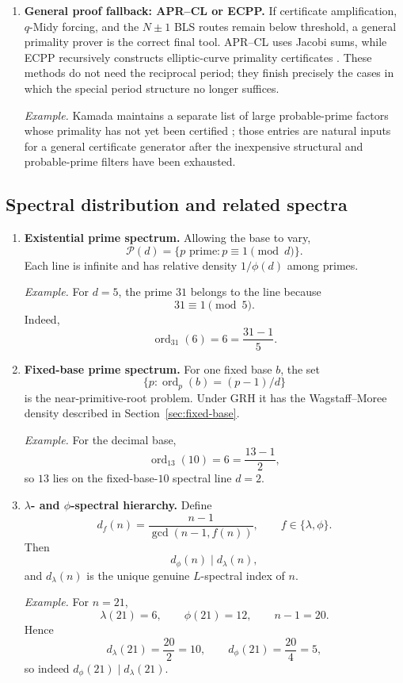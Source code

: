 \documentclass[11pt]{article}
\newcommand{\ord}{\operatorname{ord}}
\begin{document}
\begin{enumerate}[label=\textbf{T\arabic*.},leftmargin=2.2em,resume]
\item \textbf{General proof fallback: APR--CL or ECPP.}
If certificate amplification, $q$-Midy forcing, and the $N\pm1$ BLS routes
remain below threshold, a general primality prover is the correct final tool.
APR--CL uses Jacobi sums, while ECPP recursively constructs elliptic-curve
primality certificates \cite{APR1983,CohenLenstra1984,AtkinMorain1993}.
These methods do not need the reciprocal period; they finish precisely the
cases in which the special period structure no longer suffices.

\smallskip
\noindent\emph{Example.}
Kamada maintains a separate list of large probable-prime factors whose
primality has not yet been certified \cite{KamadaPRP}; those entries are
natural inputs for a general certificate generator after the inexpensive
structural and probable-prime filters have been exhausted.
\end{enumerate}

\subsection{Spectral distribution and related spectra}

\begin{enumerate}[label=\textbf{T\arabic*.},leftmargin=2.2em,resume]
\item \textbf{Existential prime spectrum.}
Allowing the base to vary,
\[
\mathcal P(d)=\{p\text{ prime}:p\equiv1\pmod d\}.
\]
Each line is infinite and has relative density $1/\phi(d)$ among primes.

\smallskip
\noindent\emph{Example.}
For $d=5$, the prime $31$ belongs to the line because
\[
31\equiv1\pmod5.
\]
Indeed,
\[
\ord_{31}(6)=6=\frac{31-1}{5}.
\]

\item \textbf{Fixed-base prime spectrum.}
For one fixed base $b$, the set
\[
\{p:\ord_p(b)=(p-1)/d\}
\]
is the near-primitive-root problem.  Under GRH it has the
Wagstaff--Moree density described in Section~\ref{sec:fixed-base}.

\smallskip
\noindent\emph{Example.}
For the decimal base,
\[
\ord_{13}(10)=6=\frac{13-1}{2},
\]
so $13$ lies on the fixed-base-$10$ spectral line $d=2$.

\item \textbf{$\lambda$- and $\phi$-spectral hierarchy.}
Define
\[
d_f(n)=\frac{n-1}{\gcd(n-1,f(n))},
\qquad f\in\{\lambda,\phi\}.
\]
Then
\[
d_\phi(n)\mid d_\lambda(n),
\]
and $d_\lambda(n)$ is the unique genuine $L$-spectral index of $n$.

\smallskip
\noindent\emph{Example.}
For $n=21$,
\[
\lambda(21)=6,\qquad \phi(21)=12,\qquad n-1=20.
\]
Hence
\[
d_\lambda(21)=\frac{20}{2}=10,
\qquad
d_\phi(21)=\frac{20}{4}=5,
\]
so indeed $d_\phi(21)\mid d_\lambda(21)$.
\end{enumerate}
\end{document}

